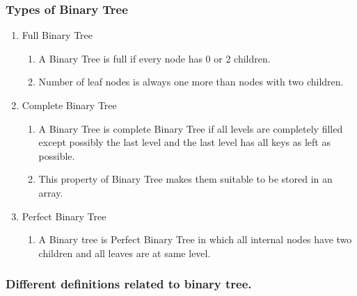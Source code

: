 \documentclass[11pt]{article}
\begin{document}
\subsubsection{Types of Binary Tree}
\begin{enumerate}
    \item Full Binary Tree
    \begin{enumerate}
        \item A Binary Tree is full if every node has 0 or 2 children.
        \item Number of leaf nodes is always one more than nodes with two children.
    \end{enumerate}
    \item Complete Binary Tree
    \begin{enumerate}
        \item A Binary Tree is complete Binary Tree if all levels are completely filled except possibly the last level and the last level has all keys as left as possible.
        \item This property of Binary Tree makes them suitable to be stored in an array.
    \end{enumerate}
    \item Perfect Binary Tree
    \begin{enumerate}
        \item A Binary tree is Perfect Binary Tree in which all internal nodes have two children and all leaves are at same level.
    \end{enumerate}
\end{enumerate}


\subsubsection{Different definitions related to binary tree.}
\end{document}
